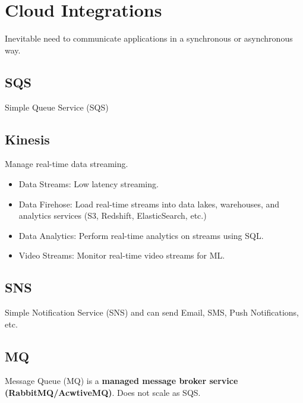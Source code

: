 \section{Cloud Integrations}\label{sec:cloud-integrations}
Inevitable need to communicate applications in a synchronous or asynchronous way.

\subsection{SQS}\label{subsec:sqs}
Simple Queue Service (SQS)

\subsection{Kinesis}\label{subsec:kinesis}
Manage real-time data streaming.

\begin{itemize}
    \item{Data Streams:} Low latency streaming.
    \item{Data Firehose:} Load real-time streams into data lakes, warehouses, and analytics services
    (S3, Redshift, ElasticSearch, etc.)
    \item{Data Analytics:} Perform real-time analytics on streams using SQL\@.
    \item{Video Streams:} Monitor real-time video streams for ML\@.
\end{itemize}

\subsection{SNS}\label{subsec:sns}
Simple Notification Service (SNS)  and
can send Email, SMS, Push Notifications, etc.

\subsection{MQ}\label{subsec:mq}
Message Queue (MQ) is a \textbf{managed message broker service (RabbitMQ/AcwtiveMQ)}.
Does not scale as SQS\@.

